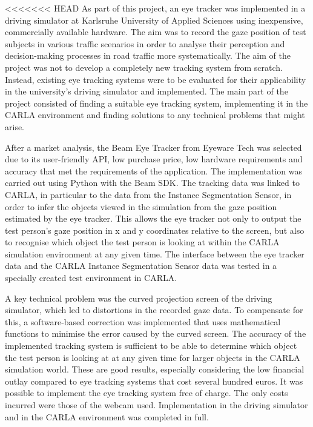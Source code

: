 
<<<<<<< HEAD
As part of this project, an eye tracker was implemented in a driving simulator at Karlsruhe University of Applied Sciences using inexpensive, commercially available hardware. The aim was to record the gaze position of test subjects in various traffic scenarios in order to analyse their perception and decision-making processes in road traffic more systematically. The aim of the project was not to develop a completely new tracking system from scratch. Instead, existing eye tracking systems were to be evaluated for their applicability in the university's driving simulator and implemented. The main part of the project consisted of finding a suitable eye tracking system, implementing it in the CARLA environment and finding solutions to any technical problems that might arise. 

After a market analysis, the Beam Eye Tracker from Eyeware Tech was selected due to its user-friendly API, low purchase price, low hardware requirements and accuracy that met the requirements of the application. The implementation was carried out using Python with the Beam SDK. The tracking data was linked to CARLA, in particular to the data from the Instance Segmentation Sensor, in order to infer the objects viewed in the simulation from the gaze position estimated by the eye tracker. This allows the eye tracker not only to output the test person's gaze position in x and y coordinates relative to the screen, but also to recognise which object the test person is looking at within the CARLA simulation environment at any given time. The interface between the eye tracker data and the CARLA Instance Segmentation Sensor data was tested in a specially created test environment in CARLA. 

A key technical problem was the curved projection screen of the driving simulator, which led to distortions in the recorded gaze data. To compensate for this, a software-based correction was implemented that uses mathematical functions to minimise the error caused by the curved screen. The accuracy of the implemented tracking system is sufficient to be able to determine which object the test person is looking at at any given time for larger objects in the CARLA simulation world. These are good results, especially considering the low financial outlay compared to eye tracking systems that cost several hundred euros. It was possible to implement the eye tracking system free of charge. The only costs incurred were those of the webcam used. Implementation in the driving simulator and in the CARLA environment was completed in full.

